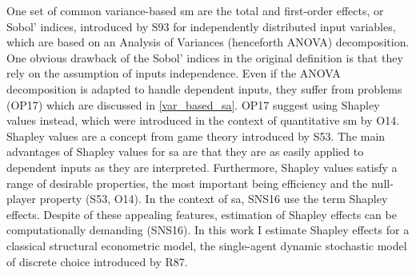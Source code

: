 One set of common variance-based sm are the total and first-order effects, or Sobol’ indices, introduced by S93 for independently distributed input variables, which are based on an Analysis of Variances (henceforth ANOVA) decomposition. One obvious drawback of the Sobol’ indices in the original definition is that they rely on the assumption of inputs independence. Even if the ANOVA decomposition is adapted to handle dependent inputs, they suffer from problems (OP17) which are discussed in \ref{var_based_sa}. OP17 suggest using Shapley values instead, which were introduced in the context of quantitative sm by O14. Shapley values are a concept from game theory introduced by S53. The main advantages of Shapley values for sa are that they are as easily applied to dependent inputs as they are interpreted. Furthermore, Shapley values satisfy a range of desirable properties, the most important being efficiency and the null-player property (S53, O14). In the context of sa, SNS16 use the term Shapley effects. Despite of these appealing features, estimation of Shapley effects can be computationally demanding (SNS16).
In this work I estimate Shapley effects for a classical structural econometric model, the single-agent dynamic stochastic model of discrete choice introduced by R87.